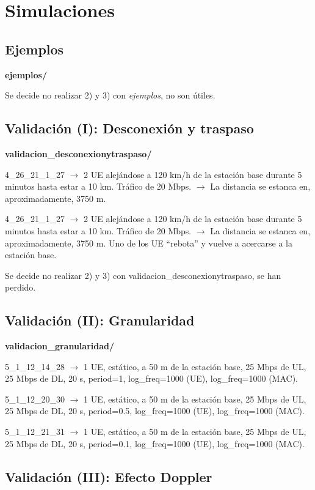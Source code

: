 \documentclass[12pt]{report} %
\begin{document}
\section* {Simulaciones}

\subsection* {Ejemplos}

\textbf{ejemplos/}

Se decide no realizar 2) y 3) con \textit{ejemplos}, no son útiles.

\subsection* {Validación (I): Desconexión y traspaso}

\textbf{validacion\_desconexionytraspaso/}

4\_26\_21\_1\_27 $\rightarrow$ 2 UE alejándose a 120 km/h de la estación base durante 5 minutos hasta estar a 10 km. Tráfico de 20 Mbps.  $\rightarrow$  La distancia se estanca en, aproximadamente, 3750 m.

4\_26\_21\_1\_27 $\rightarrow$ 2 UE alejándose a 120 km/h de la estación base durante 5 minutos hasta estar a 10 km. Tráfico de 20 Mbps.  $\rightarrow$  La distancia se estanca en, aproximadamente, 3750 m. Uno de los UE ``rebota'' y vuelve a acercarse a la estación base.

Se decide no realizar 2) y 3) con validacion\_desconexionytraspaso, se han perdido.

\subsection* {Validación (II): Granularidad}

\textbf{validacion\_granularidad/}

5\_1\_12\_14\_28 $\rightarrow$ 1 UE, estático, a 50 m de la estación base, 25 Mbps de UL,  25 Mbps de DL, 20 s, period=1, log\_freq=1000 (UE), log\_freq=1000 (MAC).

5\_1\_12\_20\_30 $\rightarrow$ 1 UE, estático, a 50 m de la estación base, 25 Mbps de UL,  25 Mbps de DL, 20 s, period=0.5, log\_freq=1000 (UE), log\_freq=1000 (MAC).

5\_1\_12\_21\_31 $\rightarrow$ 1 UE, estático, a 50 m de la estación base, 25 Mbps de UL,  25 Mbps de DL, 20 s, period=0.1, log\_freq=1000 (UE), log\_freq=1000 (MAC).

\subsection* {Validación (III): Efecto Doppler}
\end{document}
